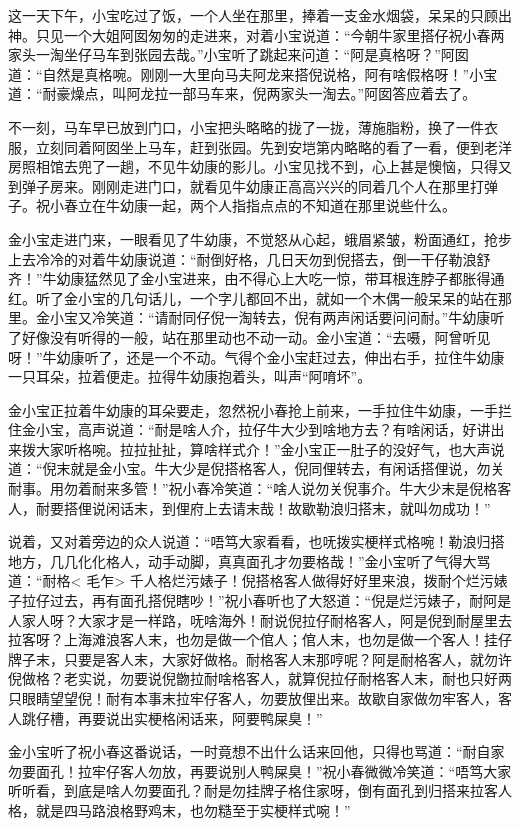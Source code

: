 \documentclass[12pt,UTF8]{ctexbook}
\begin{document}
{{{这一天下午，小宝吃过了饭，一个人坐在那里，捧着一支金水烟袋，呆呆的只顾出神。只见一个大姐阿囡匆匆的走进来，对着小宝说道：“今朝牛家里搭仔祝小春两家头一淘坐仔马车到张园去哉。”小宝听了跳起来问道：“阿是真格呀？”阿囡道：“自然是真格啘。刚刚一大里向马夫阿龙来搭倪说格，阿有啥假格呀！”小宝道：“耐豪燥点，叫阿龙拉一部马车来，倪两家头一淘去。”阿囡答应着去了。

不一刻，马车早已放到门口，小宝把头略略的拢了一拢，薄施脂粉，换了一件衣服，立刻同着阿囡坐上马车，赶到张园。先到安垲第内略略的看了一看，便到老洋房照相馆去兜了一趟，不见牛幼康的影儿。小宝见找不到，心上甚是懊恼，只得又到弹子房来。刚刚走进门口，就看见牛幼康正高高兴兴的同着几个人在那里打弹子。祝小春立在牛幼康一起，两个人指指点点的不知道在那里说些什么。

金小宝走进门来，一眼看见了牛幼康，不觉怒从心起，蛾眉紧皱，粉面通红，抢步上去冷冷的对着牛幼康说道：“耐倒好格，几日天勿到倪搭去，倒一干仔勒浪舒齐！”牛幼康猛然见了金小宝进来，由不得心上大吃一惊，带耳根连脖子都胀得通红。听了金小宝的几句话儿，一个字儿都回不出，就如一个木偶一般呆呆的站在那里。金小宝又冷笑道：“请耐同仔倪一淘转去，倪有两声闲话要问问耐。”牛幼康听了好像没有听得的一般，站在那里动也不动一动。金小宝道：“去嗫，阿曾听见呀！”牛幼康听了，还是一个不动。气得个金小宝赶过去，伸出右手，拉住牛幼康一只耳朵，拉着便走。拉得牛幼康抱着头，叫声“阿唷坏”。

金小宝正拉着牛幼康的耳朵要走，忽然祝小春抢上前来，一手拉住牛幼康，一手拦住金小宝，高声说道：“耐是啥人介，拉仔牛大少到啥地方去？有啥闲话，好讲出来拨大家听格啘。拉拉扯扯，算啥样式介！”金小宝正一肚子的没好气，也大声说道：“倪末就是金小宝。牛大少是倪搭格客人，倪同俚转去，有闲话搭俚说，勿关耐事。用勿着耐来多管！”祝小春冷笑道：“啥人说勿关倪事介。牛大少末是倪格客人，耐要搭俚说闲话末，到俚府上去请末哉！故歇勒浪归搭末，就叫勿成功！”

说着，又对着旁边的众人说道：“唔笃大家看看，也呒拨实梗样式格啘！勒浪归搭地方，几几化化格人，动手动脚，真真面孔才勿要格哉！”金小宝听了气得大骂道：“耐格< 毛乍> 千人格烂污婊子！倪搭格客人做得好好里来浪，拨耐个烂污婊子拉仔过去，再有面孔搭倪瞎吵！”祝小春听也了大怒道：“倪是烂污婊子，耐阿是人家人呀？大家才是一样路，呒啥海外！耐说倪拉仔耐格客人，阿是倪到耐屋里去拉客呀？上海滩浪客人末，也勿是做一个倌人；倌人末，也勿是做一个客人！挂仔牌子末，只要是客人末，大家好做格。耐格客人末那哼呢？阿是耐格客人，就勿许倪做格？老实说，勿要说倪朆拉耐啥格客人，就算倪拉仔耐格客人末，耐也只好两只眼睛望望倪！耐有本事末拉牢仔客人，勿要放俚出来。故歇自家做勿牢客人，客人跳仔槽，再要说出实梗格闲话来，阿要鸭屎臭！”

金小宝听了祝小春这番说话，一时竟想不出什么话来回他，只得也骂道：“耐自家勿要面孔！拉牢仔客人勿放，再要说别人鸭屎臭！”祝小春微微冷笑道：“唔笃大家听听看，到底是啥人勿要面孔？耐是勿挂牌子格住家呀，倒有面孔到归搭来拉客人格，就是四马路浪格野鸡末，也勿糙至于实梗样式啘！”

}}}
\end{document}
